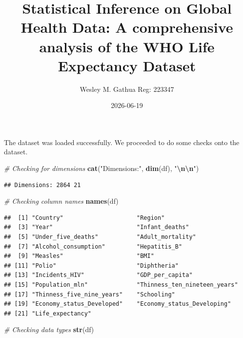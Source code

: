\documentclass[
  10pt,
]{article}
\title{Statistical Inference on Global Health Data: A comprehensive
analysis of the WHO Life Expectancy Dataset}
\author{Wesley M. Gathua \textbar{} Reg: 223347}
\date{2026-06-19}
\newenvironment{Shaded}{\begin{snugshade}}{\end{snugshade}}
\newcommand{\CommentTok}[1]{\textcolor[rgb]{0.56,0.35,0.01}{\textit{#1}}}
\newcommand{\FunctionTok}[1]{\textcolor[rgb]{0.13,0.29,0.53}{\textbf{#1}}}
\newcommand{\NormalTok}[1]{#1}
\newcommand{\SpecialCharTok}[1]{\textcolor[rgb]{0.81,0.36,0.00}{\textbf{#1}}}
\newcommand{\StringTok}[1]{\textcolor[rgb]{0.31,0.60,0.02}{#1}}
\begin{document}
\maketitle

\newpage

The dataset was loaded successfully. We proceeded to do some checks onto
the dataset.\\

\begin{Shaded}
\begin{Highlighting}[]
\CommentTok{\# Checking for dimensions}
\FunctionTok{cat}\NormalTok{(}\StringTok{"Dimensions:"}\NormalTok{, }\FunctionTok{dim}\NormalTok{(df), }\StringTok{"}\SpecialCharTok{\textbackslash{}n\textbackslash{}n}\StringTok{"}\NormalTok{)}
\end{Highlighting}
\end{Shaded}

\begin{verbatim}
## Dimensions: 2864 21
\end{verbatim}

\begin{Shaded}
\begin{Highlighting}[]
\CommentTok{\# Checking column names}
\FunctionTok{names}\NormalTok{(df)}
\end{Highlighting}
\end{Shaded}

\begin{verbatim}
##  [1] "Country"                     "Region"                     
##  [3] "Year"                        "Infant_deaths"              
##  [5] "Under_five_deaths"           "Adult_mortality"            
##  [7] "Alcohol_consumption"         "Hepatitis_B"                
##  [9] "Measles"                     "BMI"                        
## [11] "Polio"                       "Diphtheria"                 
## [13] "Incidents_HIV"               "GDP_per_capita"             
## [15] "Population_mln"              "Thinness_ten_nineteen_years"
## [17] "Thinness_five_nine_years"    "Schooling"                  
## [19] "Economy_status_Developed"    "Economy_status_Developing"  
## [21] "Life_expectancy"
\end{verbatim}

\begin{Shaded}
\begin{Highlighting}[]
\CommentTok{\# Checking data types}
\FunctionTok{str}\NormalTok{(df)}
\end{Highlighting}
\end{Shaded}
\end{document}
